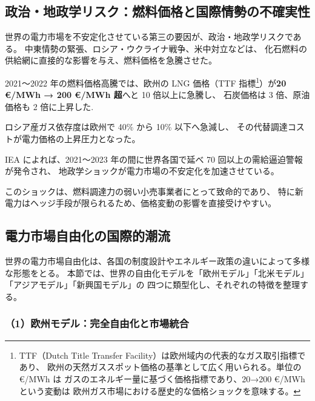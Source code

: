 
\subsection{政治・地政学リスク：燃料価格と国際情勢の不確実性}

世界の電力市場を不安定化させている第三の要因が、政治・地政学リスクである。
中東情勢の緊張、ロシア・ウクライナ戦争、米中対立などは、
化石燃料の供給網に直接的な影響を与え、燃料価格を急騰させた。

2021〜2022 年の燃料価格高騰では、欧州の LNG 価格（TTF 指標\footnote{
TTF（Dutch Title Transfer Facility）は欧州域内の代表的なガス取引指標であり、
欧州の天然ガススポット価格の基準として広く用いられる。単位の €/MWh は
ガスのエネルギー量に基づく価格指標であり、20→200 €/MWh という変動は
欧州ガス市場における歴史的な価格ショックを意味する。
}）が\textbf{20 €/MWh → 200 €/MWh 超}へと 10 倍以上に急騰し、  
石炭価格は 3 倍、原油価格も 2 倍に上昇した\parencite{IEA2022GasMarket}.

ロシア産ガス依存度は欧州で 40\% から 10\% 以下へ急減し、
その代替調達コストが電力価格の上昇圧力となった。

IEA によれば、2021〜2023 年の間に世界各国で延べ 70 回以上の需給逼迫警報が発令され、
地政学ショックが電力市場の不安定化を加速させている\parencite{IEA2024Electricity}。

このショックは、燃料調達力の弱い小売事業者にとって致命的であり、
特に新電力はヘッジ手段が限られるため、価格変動の影響を直接受けやすい。



\subsection{電力市場自由化の国際的潮流}

世界の電力市場自由化は、各国の制度設計やエネルギー政策の違いによって多様な形態をとる。
本節では、世界の自由化モデルを「欧州モデル」「北米モデル」「アジアモデル」「新興国モデル」の
四つに類型化し、それぞれの特徴を整理する。

\subsubsection{（1）欧州モデル：完全自由化と市場統合}

